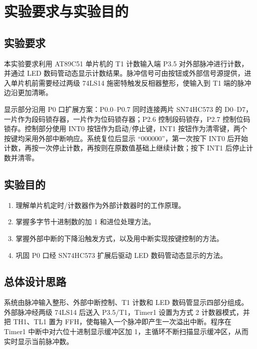 \section{实验要求与实验目的}

\subsection{实验要求}
本实验要求利用 AT89C51 单片机的 T1 计数输入端 P3.5 对外部脉冲进行计数，并通过 LED 数码管动态显示计数结果。脉冲信号可由按钮或外部信号源提供，进入单片机前需要经过两级 74LS14 施密特触发反相器整形，使输入到 T1 端的脉冲边沿更加清晰。

显示部分沿用 P0 口扩展方案：P0.0--P0.7 同时连接两片 SN74HC573 的 D0--D7，一片作为段码锁存器，一片作为位码锁存器；P2.6 控制段码锁存，P2.7 控制位码锁存。控制部分使用 INT0 按钮作为启动/停止键，INT1 按钮作为清零键，两个按键均采用外部中断响应。系统复位后显示 ``000000''，第一次按下 INT0 后开始计数，再按一次停止计数，再按则在原数值基础上继续计数；按下 INT1 后停止计数并清零。

\subsection{实验目的}
\begin{enumerate}
  \item 理解单片机定时/计数器作为外部计数器时的工作原理。
  \item 掌握多字节十进制数的加 1 和进位处理方法。
  \item 掌握外部中断的下降沿触发方式，以及用中断实现按键控制的方法。
  \item 巩固 P0 口经 SN74HC573 扩展后驱动 LED 数码管动态显示的方法。
\end{enumerate}

\subsection{总体设计思路}
系统由脉冲输入整形、外部中断控制、T1 计数和 LED 数码管显示四部分组成。外部脉冲经两级 74LS14 后送入 P3.5/T1，Timer1 设置为方式 2 计数器模式，并把 TH1、TL1 置为 FFH，使每输入一个脉冲即产生一次溢出中断。程序在 Timer1 中断中对六位十进制显示缓冲区加 1，主循环不断扫描显示缓冲区，从而实时显示当前脉冲数。

